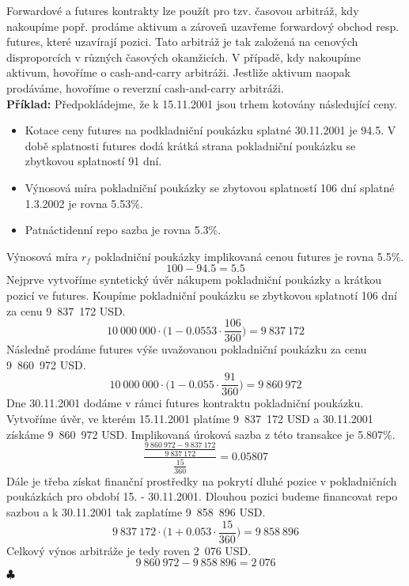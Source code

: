 \documentclass[a4paper]{book}
\begin{document}
Forwardové a futures kontrakty lze použít pro tzv. časovou arbitráž, kdy nakoupíme popř. prodáme aktivum a zároveň uzavřeme forwardový obchod resp. futures, které uzavírají pozici. Tato arbitráž je tak založená na cenových disproporcích v různých časových okamžicích. V případě, kdy nakoupíme aktivum, hovoříme o cash-and-carry arbitráži. Jestliže aktivum naopak prodáváme, hovoříme o reverzní cash-and-carry arbitráži.\\

\noindent \textbf{Příklad:} Předpokládejme, že k 15.11.2001 jsou trhem kotovány následující ceny.
\begin{itemize}
\item Kotace ceny futures na podkladniční poukázku splatné 30.11.2001 je 94.5. V době splatnosti futures dodá krátká strana pokladniční poukázku se zbytkovou splatností 91 dní.
\item Výnosová míra pokladniční poukázky se zbytovou splatností 106 dní splatné 1.3.2002 je rovna 5.53\%.
\item Patnáctidenní repo sazba je rovna 5.3\%.
\end{itemize}
Výnosová míra $r_f$ pokladniční poukázky implikovaná cenou futures je rovna 5.5\%.
\begin{equation*}
100 - 94.5 = 5.5
\end{equation*}
Nejprve vytvoříme syntetický úvěr nákupem pokladniční poukázky a krátkou pozicí ve futures. Koupíme pokladniční poukázku se zbytkovou splatnotí 106 dní za cenu 9~837~172 USD.
\begin{equation*}
10~000~000 \cdot \Bigg(1 - 0.0553 \cdot \frac{106}{360} \Bigg) = 9~837~172
\end{equation*}
Následně prodáme futures výše uvažovanou pokladniční poukázku za cenu 9~860~972 USD.
\begin{equation*}
10~000~000 \cdot \Bigg(1 - 0.055 \cdot \frac{91}{360} \Bigg) = 9~860~972
\end{equation*}
Dne 30.11.2001 dodáme v rámci futures kontraktu pokladniční poukázku. Vytvoříme úvěr, ve kterém 15.11.2001 platíme 9~837~172 USD a 30.11.2001 získáme 9~860~972 USD. Implikovaná úroková sazba z této transakce je 5.807\%.
\begin{equation*}
\frac{\frac{9~860~972 - 9~837~172}{9~837~172}}{\frac{15}{360}} = 0.05807
\end{equation*}
Dále je třeba získat finanční prostředky na pokrytí dluhé pozice v pokladničních poukázkách pro období 15. - 30.11.2001. Dlouhou pozici budeme financovat repo sazbou a k 30.11.2001 tak zaplatíme 9~858~896 USD. 
\begin{equation*}
9~837~172 \cdot \Bigg(1 + 0.053 \cdot \frac{15}{360} \Bigg) =  9~858~896
\end{equation*}
Celkový výnos arbitráže je tedy roven 2~076 USD.
\begin{equation*}
9~860~972 - 9~858~896 = 2~076
\end{equation*}
$\clubsuit$\\
\end{document}
